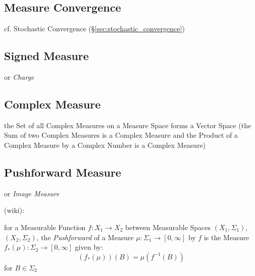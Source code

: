 \subsection{Measure Convergence}\label{sec:measure_convergence}

cf. Stochastic Convergence (\S\ref{sec:stochastic_convergence})



\subsection{Signed Measure}\label{sec:signed_measure}

or \emph{Charge}



\subsection{Complex Measure}\label{sec:complex_measure}

the Set of all Complex Measures on a Measure Space forms a Vector Space (the Sum
of two Complex Measures is a Complex Measure and the Product of a Complex
Measure by a Complex Number is a Complex Measure)



\subsection{Pushforward Measure}\label{sec:pushforward_measure}

or \emph{Image Measure}

(wiki):

for a Measurable Function $f : X_1 \rightarrow X_2$ between Measurable Spaces
$(X_1, \Sigma_1)$, $(X_2, \Sigma_2)$, the \emph{Pushforward} of a Measure
$\mu : \Sigma_1 \rightarrow [0, \infty]$ by $f$ is the Measure
$f_*(\mu) : \Sigma_2 \rightarrow [0, \infty]$ given by:
\[
  (f_*(\mu))(B) = \mu(f^{-1}(B))
\]
for $B \in \Sigma_2$

